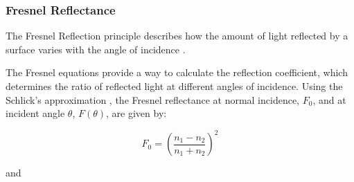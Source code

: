
    



\subsubsection{Fresnel Reflectance}
\label{Fresnel}

The Fresnel Reflection principle describes how the amount of light reflected by a surface varies with the angle of incidence \cite{iten_understanding_2018}. 

The Fresnel equations provide a way to calculate the reflection coefficient, which determines the ratio of reflected light at different angles of incidence. Using the Schlick's approximation \cite{dunn_schlicks_nodate}, the Fresnel reflectance at normal incidence, $F_0$, and at incident angle $\theta$, $F(\theta)$, are given by:

\begin{equation}
F_0 = \left( \frac{n_1 - n_2}{n_1 + n_2} \right)^2
\end{equation}

and



